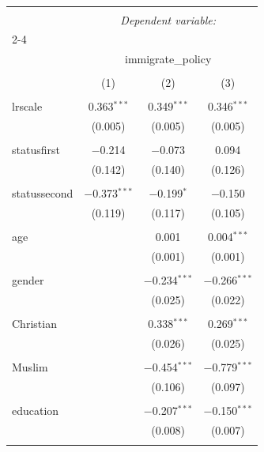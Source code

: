 
\begin{table}[!htbp] \centering 
  \caption{} 
  \label{} 
\begin{tabular}{@{\extracolsep{5pt}}lccc} 
\\[-1.8ex]\hline 
\hline \\[-1.8ex] 
 & \multicolumn{3}{c}{\textit{Dependent variable:}} \\ 
\cline{2-4} 
\\[-1.8ex] & \multicolumn{3}{c}{immigrate\_policy} \\ 
\\[-1.8ex] & (1) & (2) & (3)\\ 
\hline \\[-1.8ex] 
 lrscale & 0.363$^{***}$ & 0.349$^{***}$ & 0.346$^{***}$ \\ 
  & (0.005) & (0.005) & (0.005) \\ 
  & & & \\ 
 statusfirst & $-$0.214 & $-$0.073 & 0.094 \\ 
  & (0.142) & (0.140) & (0.126) \\ 
  & & & \\ 
 statussecond & $-$0.373$^{***}$ & $-$0.199$^{*}$ & $-$0.150 \\ 
  & (0.119) & (0.117) & (0.105) \\ 
  & & & \\ 
 age &  & 0.001 & 0.004$^{***}$ \\ 
  &  & (0.001) & (0.001) \\ 
  & & & \\ 
 gender &  & $-$0.234$^{***}$ & $-$0.266$^{***}$ \\ 
  &  & (0.025) & (0.022) \\ 
  & & & \\ 
 Christian &  & 0.338$^{***}$ & 0.269$^{***}$ \\ 
  &  & (0.026) & (0.025) \\ 
  & & & \\ 
 Muslim &  & $-$0.454$^{***}$ & $-$0.779$^{***}$ \\ 
  &  & (0.106) & (0.097) \\ 
  & & & \\ 
 education &  & $-$0.207$^{***}$ & $-$0.150$^{***}$ \\ 
  &  & (0.008) & (0.007) \\ 
  & & & \\ 

\end{tabular}
\end{table}

